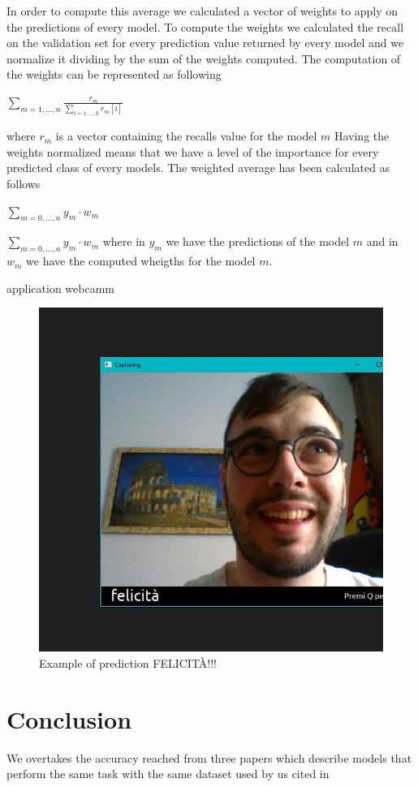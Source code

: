 \documentclass[10pt,twocolumn,letterpaper]{article}
\begin{document}
In order to compute this average we calculated a vector of weights to apply on the predictions of every model. To compute the weights we calculated the recall on the validation set for every prediction value returned by every model and we normalize it dividing by the sum of the weights computed.
The computation of the weights can be represented as following
\begin{center}
   $\sum_{m=1,...,n} \frac{r_{m}}{\sum_{i=1,...,6} r_{m}[i]}$

\end{center}
where $r_m$ is a vector containing the recalls value for the model $m$
Having the weights normalized means that we have a level of the importance for every predicted class of every models.
The weighted average has been calculated as follows
\begin{center}
   $\sum_{m=0,...,n} y_m\cdot w_m$
\end{center}
$\sum_{m=0,...,n} y_m\cdot w_m$
where in $y_m$ we have the predictions of the model $m$
and in $w_m$ we have the computed wheigths for the model $m$.


application webcamm

\begin{figure}[H]
   \centering
   \includegraphics[width=1\linewidth]{./immagini/felicita.jpg}
   \caption{Example of prediction FELICITÀ!!!}
\end{figure}

\section{Conclusion}

We overtakes the accuracy reached from three papers which describe models that perform the same task with the same dataset used by us cited in \cite{paper}




\newpage
{\small
   
   
}
\end{document}
